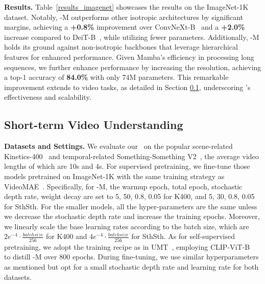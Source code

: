 \vspace{0.05cm}
\noindent\textbf{Results.}
Table~\ref{results_imagenet} showcases the results on the ImageNet-1K dataset. 
Notably, 
\ModelName-M outperforms other isotropic architectures by significant margins, achieving a \textbf{+0.8\%} improvement over ConvNeXt-B~\cite{convnext} and a \textbf{+2.0\%} increase compared to DeiT-B~\cite{deit}, 
while utilizing fewer parameters. 
Additionally, \ModelName-M holds its ground against non-isotropic backbones that leverage hierarchical features for enhanced performance. 
Given Mamba's efficiency in processing long sequences, 
we further enhance performance by increasing the resolution, achieving a top-1 accuracy of \textbf{84.0\%} with only 74M parameters. 
This remarkable improvement extends to video tasks, as detailed in Section \ref{sec:short_term}, underscoring \ModelName's effectiveness and scalability.





\subsection{Short-term Video Understanding}
\label{sec:short_term}


\noindent\textbf{Datasets and Settings.} 
We evaluate our \ModelName\  on the popular scene-related Kinetics-400~\cite{k400} and temporal-related Something-Something V2~\cite{sth},
the average video lengths of which are 10s and 4s.
For supervised pretraining,
we fine-tune those models pretrained on ImageNet-1K with the same training strategy as VideoMAE~\cite{videomae}.
Specifically,
for \ModelName-M,
the warmup epoch, total epoch, stochastic depth rate, weight decay are set to 5, 50, 0.8, 0.05 for K400,
and 5, 30, 0.8, 0.05 for SthSth.
For the smaller models,
all the hyper-parameters are the same unless we decrease the stochastic depth rate and increase the training epochs.
Moreover, 
we linearly scale the base learning rates according to the batch size,
which are $2e^{-4}\cdot\frac{batchsize}{256}$ for K400 and $4e^{-4}\cdot\frac{batchsize}{256}$ for SthSth.
As for self-supervised pretraining,
we adopt the training recipe as in UMT~\cite{umt},
employing CLIP-ViT-B~\cite{clip} to distill \ModelName-M over 800 epochs. 
During fine-tuning,
we use similar hyperparameters as mentioned but opt for a small stochastic depth rate and learning rate for both datasets.


